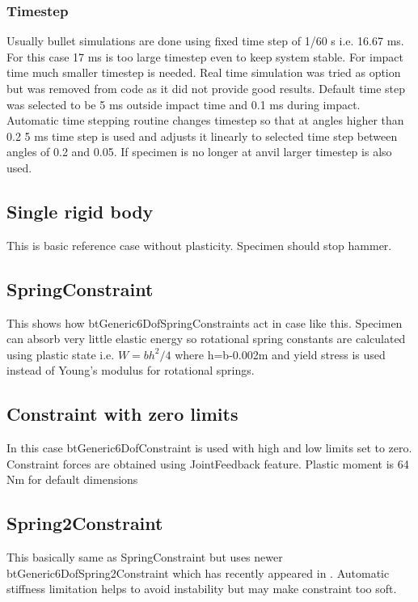 \subsubsection{Timestep}

Usually bullet simulations are done using fixed time step of 1/60 s i.e. 16.67 ms. 
For this case 17 ms is too large timestep even to keep system stable. For impact time much smaller timestep is needed. 
Real time simulation was tried as option but was removed from code as it did not provide good results.  
Default time step was selected to be 5 ms outside impact time and 0.1 ms during impact. 
Automatic time stepping routine changes timestep so that at angles higher than 0.2 5 ms time step is
used and adjusts it linearly to selected time step between angles of 0.2 and 0.05. If specimen is no
longer at anvil larger timestep is also used.

\subsection{Single rigid body}
This is basic reference case without plasticity. Specimen should stop hammer.

\subsection{SpringConstraint}
This shows how btGeneric6DofSpringConstraints act in case like this. 
Specimen can absorb very little elastic energy so rotational spring constants are calculated using plastic state i.e.
$W=bh^2/4$ where h=b-0.002m and yield stress is used instead of Young’s modulus for rotational springs.

\subsection{Constraint with zero limits}
In this case btGeneric6DofConstraint is used with high and low limits set to zero. 
Constraint forces are obtained using JointFeedback feature. Plastic moment is 64 Nm for default dimensions

\subsection{Spring2Constraint}
This basically same as SpringConstraint but uses newer btGeneric6DofSpring2Constraint which has recently appeared in
\bullet. 
Automatic stiffness limitation helps to avoid instability but may make constraint too soft.

